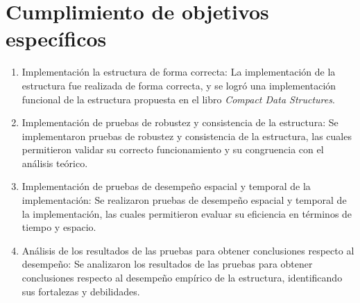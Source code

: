 \section{Cumplimiento de objetivos específicos}
\begin{enumerate}
    \item Implementación la estructura de forma correcta: La implementación de la estructura fue realizada de forma correcta, y se logró una implementación funcional de la estructura propuesta en el libro \textit{Compact Data Structures}.
    \item Implementación de pruebas de robustez y consistencia de la estructura: Se implementaron pruebas de robustez y consistencia de la estructura, las cuales permitieron validar su correcto funcionamiento y su congruencia con el análisis teórico.
    \item Implementación de pruebas de desempeño espacial y temporal de la implementación: Se realizaron pruebas de desempeño espacial y temporal de la implementación, las cuales permitieron evaluar su eficiencia en términos de tiempo y espacio.
    \item Análisis de los resultados de las pruebas para obtener conclusiones respecto al desempeño: Se analizaron los resultados de las pruebas para obtener conclusiones respecto al desempeño empírico de la estructura, identificando sus fortalezas y debilidades.
\end{enumerate}


\iffalse
\section{Medición empírica del espacio de la estructura}
\label{section:medic}

Queda como deuda de este trabajo la medición concreta y empírica del espacio de la estructura en tiempo de ejecución. Para esto es necesario cambiar ciertos elementos de la estructura, en específico, los vectores de bits que representan los pedazos de la secuencia \textit{R} representada por permutaciones. La implementación actual crea $\sigma + r$ vectores de bits, y la gran mayoría de estos tienen tamaño 2 (lo son de esta forma todos los vectores de bits extras creados al expandir las reglas). En teoría esto no es un problema pues los vectores en total suman $2n$ bits de espacio, sin embargo, cada uno de estos tiene un exceso en metadatos de 136 KB. Para solucionar esto basta reemplazar estos vectores por un solo gran vector de bits que corresponde a la concatenación de todos, y utilizar un vector auxiliar para marcar las posiciones de los vectores originales en este vector final. Con esto, se puede hacer una medición empírica más cercana a la estimada en el trabajo en la tabla \ref{tab:collect}.
\fi

